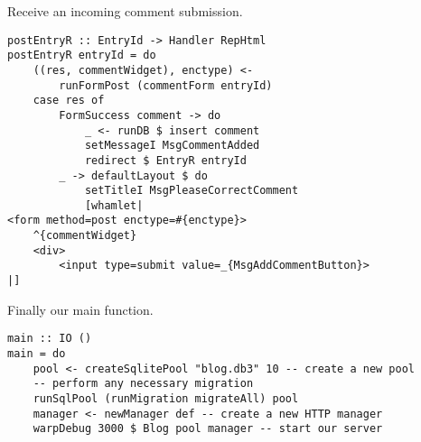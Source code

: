 Receive an incoming comment submission.

\begin{lstlisting}
postEntryR :: EntryId -> Handler RepHtml
postEntryR entryId = do
    ((res, commentWidget), enctype) <-
        runFormPost (commentForm entryId)
    case res of
        FormSuccess comment -> do
            _ <- runDB $ insert comment
            setMessageI MsgCommentAdded
            redirect $ EntryR entryId
        _ -> defaultLayout $ do
            setTitleI MsgPleaseCorrectComment
            [whamlet|
<form method=post enctype=#{enctype}>
    ^{commentWidget}
    <div>
        <input type=submit value=_{MsgAddCommentButton}>
|]
\end{lstlisting}

Finally our main function.

\begin{lstlisting}
main :: IO ()
main = do
    pool <- createSqlitePool "blog.db3" 10 -- create a new pool
    -- perform any necessary migration
    runSqlPool (runMigration migrateAll) pool
    manager <- newManager def -- create a new HTTP manager
    warpDebug 3000 $ Blog pool manager -- start our server
\end{lstlisting}